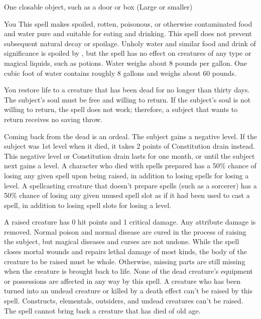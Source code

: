 \begin{spelltarget}{One closable object, such as a door or box (Large or smaller)}
\begin{spelltarget}{You}
\spelleffect This spell makes spoiled, rotten, poisonous, or otherwise contaminated food and water pure and suitable for eating and drinking. This spell does not prevent subsequent natural decay or spoilage. Unholy water and similar food and drink of significance is spoiled by , but the spell has no effect on creatures of any type or magical liquids, such as potions.
\spellnotes Water weighs about 8 pounds per gallon. One cubic foot of water contains roughly 8 gallons and weighs about 60 pounds.

\spelleffect You restore life to a creature that has been dead for no longer than thirty days. The subject's soul must be free and willing to return. If the subject's soul is not willing to return, the spell does not work; therefore, a subject that wants to return receives no saving throw.
\par Coming back from the dead is an ordeal. The subject gains a negative level. If the subject was 1st level when it died, it takes 2 points of Constitution drain instead. This negative level or Constitution drain lasts for one month, or until the subject next gains a level. A character who died with spells prepared has a 50\% chance of losing any given spell upon being raised, in addition to losing spells for losing a level. A spellcasting creature that doesn't prepare spells (such as a sorcerer) has a 50\% chance of losing any given unused spell slot as if it had been used to cast a spell, in addition to losing spell slots for losing a level.
\par A raised creature has 0 hit points and 1 critical damage. Any attribute damage is removed. Normal poison and normal disease are cured in the process of raising the subject, but magical diseases and curses are not undone. While the spell closes mortal wounds and repairs lethal damage of most kinds, the body of the creature to be raised must be whole. Otherwise, missing parts are still missing when the creature is brought back to life. None of the dead creature's equipment or possessions are affected in any way by this spell.
\spellnotes A creature who has been turned into an undead creature or killed by a death effect can't be raised by this spell. Constructs, elementals, outsiders, and undead creatures can't be raised. The spell cannot bring back a creature that has died of old age.


\end{spelltarget}
\end{spelltarget}
